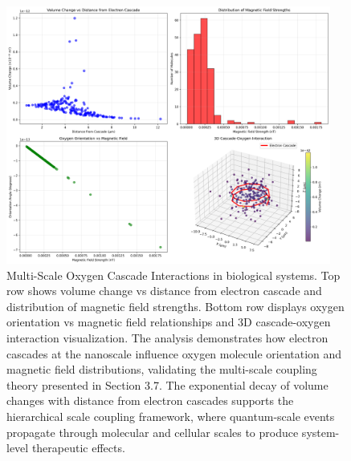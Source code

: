 \begin{figure}[htbp]
\centering
\includegraphics[width=0.95\textwidth]{images/oxygen_cascade.png}
\caption{Multi-Scale Oxygen Cascade Interactions in biological systems. Top row shows volume change vs distance from electron cascade and distribution of magnetic field strengths. Bottom row displays oxygen orientation vs magnetic field relationships and 3D cascade-oxygen interaction visualization. The analysis demonstrates how electron cascades at the nanoscale influence oxygen molecule orientation and magnetic field distributions, validating the multi-scale coupling theory presented in Section 3.7. The exponential decay of volume changes with distance from electron cascades supports the hierarchical scale coupling framework, where quantum-scale events propagate through molecular and cellular scales to produce system-level therapeutic effects.}
\label{fig:oxygen_cascade}
\end{figure}

